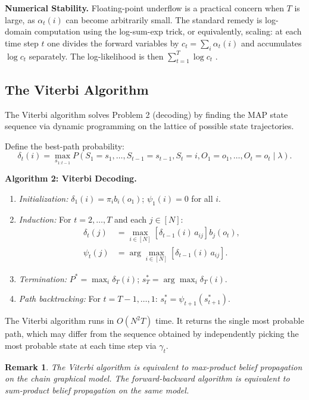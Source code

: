 \documentclass[conference]{IEEEtran}
\newtheorem{remark}{Remark}
\begin{document}
\textbf{Numerical Stability.} Floating-point underflow is a practical concern when $T$ is large, as $\alpha_t(i)$ can become arbitrarily small. The standard remedy is log-domain computation using the log-sum-exp trick, or equivalently, scaling: at each time step $t$ one divides the forward variables by $c_t = \sum_i \alpha_t(i)$ and accumulates $\log c_t$ separately. The log-likelihood is then $\sum_{t=1}^{T} \log c_t$ \cite{rabiner1989tutorial}.

\subsection{The Viterbi Algorithm}

The Viterbi algorithm \cite{viterbi1967error} solves Problem 2 (decoding) by finding the MAP state sequence via dynamic programming on the lattice of possible state trajectories.

Define the best-path probability:
\begin{equation}
\delta_t(i) = \max_{s_{1:t-1}} P(S_1 = s_1, \ldots, S_{t-1} = s_{t-1}, S_t = i, O_1 = o_1, \ldots, O_t = o_t \mid \lambda).
\label{eq:viterbi_delta}
\end{equation}

\textbf{Algorithm 2: Viterbi Decoding.}
\begin{enumerate}
  \item \textit{Initialization:} $\delta_1(i) = \pi_i b_i(o_1)$; $\psi_1(i) = 0$ for all $i$.
  \item \textit{Induction:} For $t = 2, \ldots, T$ and each $j \in [N]$:
  \begin{align}
  \delta_t(j) &= \max_{i \in [N]} \left[\delta_{t-1}(i) \, a_{ij}\right] b_j(o_t), \\
  \psi_t(j) &= \arg\max_{i \in [N]} \left[\delta_{t-1}(i) \, a_{ij}\right].
  \end{align}
  \item \textit{Termination:} $P^* = \max_{i} \delta_T(i)$; $s_T^* = \arg\max_i \delta_T(i)$.
  \item \textit{Path backtracking:} For $t = T-1, \ldots, 1$: $s_t^* = \psi_{t+1}(s_{t+1}^*)$.
\end{enumerate}

The Viterbi algorithm runs in $O(N^2 T)$ time. It returns the single most probable path, which may differ from the sequence obtained by independently picking the most probable state at each time step via $\gamma_t$.

\begin{remark}
The Viterbi algorithm is equivalent to max-product belief propagation on the chain graphical model. The forward-backward algorithm is equivalent to sum-product belief propagation on the same model.
\end{remark}
\end{document}
